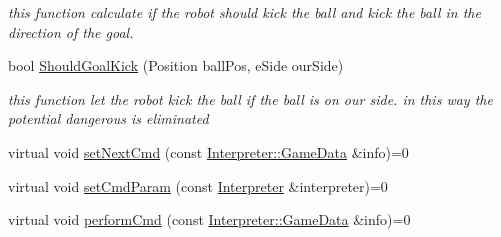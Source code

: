 \begin{DoxyCompactItemize}
\begin{DoxyCompactList}\small\item\em this function calculate if the robot should kick the ball and kick the ball in the direction of the goal. \item\end{DoxyCompactList}\item 
bool \hyperlink{classTeamRobot_ae7f6fa303c865dad297b662731165883}{ShouldGoalKick} (Position ballPos, eSide ourSide)
\begin{DoxyCompactList}\small\item\em this function let the robot kick the ball if the ball is on our side. in this way the potential dangerous is eliminated \item\end{DoxyCompactList}\item 
virtual void \hyperlink{classTeamRobot_a65f9a2b7464dfac3f4a0336810cf574f}{setNextCmd} (const \hyperlink{structInterpreter_1_1GameData}{Interpreter::GameData} \&info)=0
\item 
virtual void \hyperlink{classTeamRobot_a34c0fd6986c510d4025e5752b3c0e49a}{setCmdParam} (const \hyperlink{classInterpreter}{Interpreter} \&interpreter)=0
\item 
virtual void \hyperlink{classTeamRobot_a9b84df51ca16a7203fdb6498ea6741da}{performCmd} (const \hyperlink{structInterpreter_1_1GameData}{Interpreter::GameData} \&info)=0
\end{DoxyCompactItemize}

